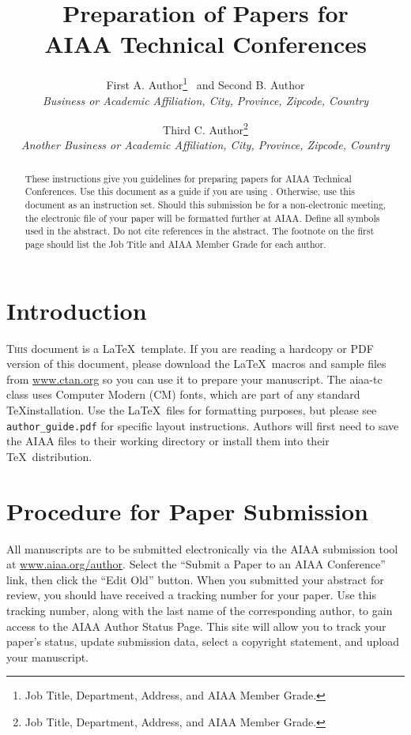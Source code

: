 \documentclass{aiaa-tc}%
\title{Preparation of Papers for\\
        AIAA Technical Conferences}
\author{%
  First A. Author\thanks{Job Title, Department, Address, and AIAA
                              Member Grade.}
  \ and
  Second B. Author\thanksibid{1}\\%
  {\normalsize\itshape
   Business or Academic Affiliation, City, Province, Zipcode, Country}\\
  \and
  Third C. Author\thanks{Job Title, Department, Address, and AIAA
                              Member Grade.}\\
  {\normalsize\itshape
   Another Business or Academic Affiliation, City, Province, Zipcode, Country}
 }
\newcommand{\cls}[1]{\textsf{#1}}
\newcommand{\file}[1]{\texttt{#1}}
\begin{document}
\maketitle

\begin{abstract}
These instructions give you guidelines for preparing papers for AIAA
Technical Conferences.
Use this document as a guide if you are using \LaTeXe.
Otherwise, use this document as an instruction set.
Should this submission be for a non-electronic meeting, the electronic
file of your paper will be formatted further at AIAA.
Define all symbols used in the abstract.
Do not cite references in the abstract.
The footnote on the first page should list the Job Title and AIAA Member
Grade for each author.
\end{abstract}

\printnomenclature

\section{Introduction}

\lettrine[nindent=0pt]{T}{his} document is a \LaTeX\ template.
If you are reading a hardcopy or PDF version of this document, please
download the \LaTeX\ macros and sample files from
\href{http://www.ctan.org/}{www.ctan.org}
so you can use it to prepare your manuscript.
The \cls{aiaa-tc} class uses Computer Modern (CM) fonts, which
are part of any standard \TeX installation.
Use the \LaTeX\ files for formatting purposes,
but please see \file{author\_guide.pdf} for specific layout instructions.
Authors will first need to save the \cls{AIAA} files to their
working directory or install them into their \TeX\ distribution.

\section{Procedure for Paper Submission}

All manuscripts are to be submitted electronically via the AIAA
submission tool at \href{http://www.aiaa.org/author}{www.aiaa.org/author}.
Select the ``Submit a Paper to an AIAA Conference'' link, then click the
``Edit Old'' button.
When you submitted your abstract for review, you should have received a
tracking number for your paper.
Use this tracking number, along with the last name of the corresponding
author, to gain access to the AIAA Author Status Page.
This site will allow you to track your paper's status, update submission
data, select a copyright statement, and upload your manuscript.
\end{document}
